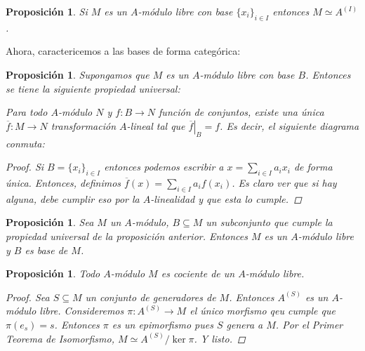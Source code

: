 \documentclass[12pt]{book}
\newtheorem{prop}[teo]{Proposición}
\theoremstyle{definition}
\begin{document}
\begin{prop}
Si $M$ es un $A$-módulo libre con base $\{x_i\}_{i\in I}$ entonces $M\simeq A^{(I)}$.
\end{prop}

Ahora, caractericemos a las bases de forma categórica:

\begin{prop}
Supongamos que $M$ es un $A$-módulo libre con base $B$. Entonces se tiene la siguiente propiedad universal:

Para todo $A$-módulo $N$ y $f:B\to N$ función de conjuntos, existe una única $\overline{f}:M\to N$ transformación $A$-lineal tal que $\left.\overline{f}\right|_{B} = f$. Es decir, el siguiente diagrama conmuta:

\begin{proof}

Si $B=\{x_i\}_{i\in I}$ entonces podemos escribir a $x=\displaystyle\sum_{i\in I}a_ix_i$ de forma única. Entonces, definimos $\overline{f}(x) = \displaystyle\sum_{i\in I}a_if(x_i)$. Es claro ver que si hay alguna, debe cumplir eso por la $A$-linealidad y que esta lo cumple.

\end{proof}
\end{prop}

\begin{prop}
Sea $M$ un $A$-módulo, $B\subseteq M$ un subconjunto que cumple la propiedad universal de la proposición anterior. Entonces $M$ es un $A$-módulo libre y $B$ es base de $M$.
\end{prop}

\begin{prop}
Todo $A$-módulo $M$ es cociente de un $A$-módulo libre.
\begin{proof}
Sea $S\subseteq M$ un conjunto de generadores de $M$. Entonces $A^{(S)}$ es un $A$-módulo libre. Consideremos $\pi:A^{(S)}\to M$ el único morfismo qeu cumple que $\pi(e_s)=s$. Entonces $\pi$ es un epimorfismo pues $S$ genera a $M$. Por el Primer Teorema de Isomorfismo, $M\simeq A^{(S)}/\ker \pi$. Y listo.
\end{proof}
\end{prop}
\end{document}

